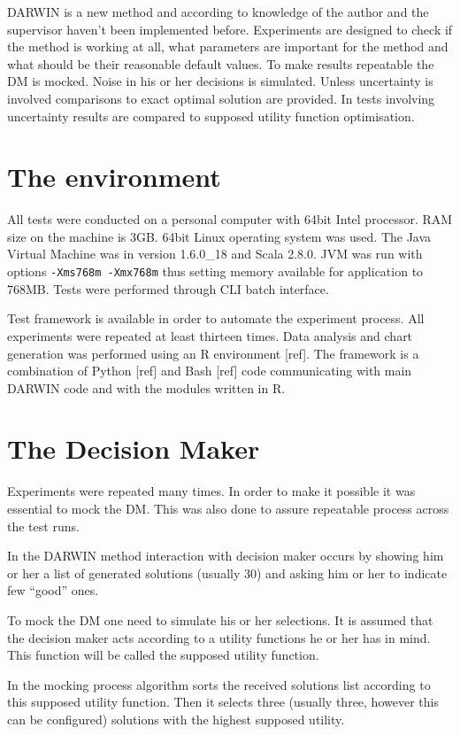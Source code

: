 DARWIN is a new method and according to knowledge of the author and the
supervisor haven't been implemented before. Experiments are
designed to check if the method is working at all, what parameters are important
for the method and what should be their reasonable default values. To make
results repeatable the DM is mocked. Noise in his or her decisions is
simulated. Unless uncertainty is involved comparisons to exact optimal
solution are provided. In tests involving uncertainty results are compared to
supposed utility function optimisation. 

\section{The environment}

All tests were conducted on a personal computer with 64bit Intel
processor. RAM size on the machine is 3GB. 64bit Linux operating system was
used. The Java Virtual Machine was in version 1.6.0\_18 and Scala 2.8.0. JVM
was run with options \texttt{-Xms768m -Xmx768m} thus setting memory available
for application to 768MB. Tests were performed through CLI batch interface.

Test framework is available in order to automate the experiment process. All
experiments were repeated at least thirteen times. Data analysis and chart
generation was performed using an R environment [ref]. The framework is a
combination of Python [ref] and Bash [ref] code communicating with main DARWIN
code and with the modules written in R.

\section{The Decision Maker}

Experiments were repeated many times. In order to make it possible it was
essential to mock the DM. This was also done to assure repeatable process
across the test runs.

In the DARWIN method interaction with decision maker occurs by showing him or
her a list of generated solutions (usually 30) and asking him or her to
indicate few ``good'' ones.

To mock the DM one need to simulate his or her selections. It is assumed that
the decision maker acts according to a utility functions he or her has in
mind. This function will be called the supposed utility function.

In the mocking process algorithm sorts the received solutions list according
to this supposed utility function. Then it selects three (usually three,
however this can be configured) solutions with the highest supposed utility.

